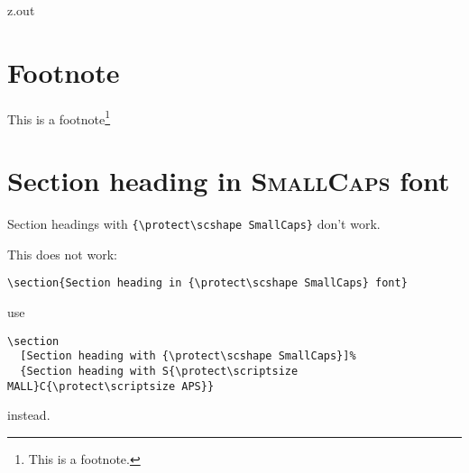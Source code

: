 \MyIO


%
% 
% 
% 
% 


\begin{VerbatimOut}{z.out}


\section{Footnote}

This is a footnote\footnote{This is a footnote.}%
\index{\verb+\footnote+}%
\end{VerbatimOut}

\MyIO


\section{Section heading in {\protect\scshape SmallCaps} font}
\label{section-headings-with-smallcaps-font}

Section headings with \verb+{\protect\scshape SmallCaps}+ don't work.%

\mbox{}


This does not work:
\begin{verbatim}
\section{Section heading in {\protect\scshape SmallCaps} font}
\end{verbatim}
use
\begin{verbatim}
\section
  [Section heading with {\protect\scshape SmallCaps}]%
  {Section heading with S{\protect\scriptsize MALL}C{\protect\scriptsize APS}}
\end{verbatim}
instead.


